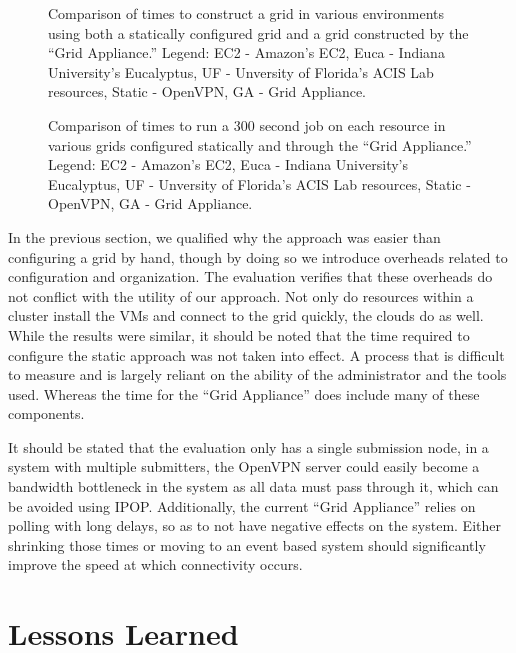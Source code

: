 \documentclass[conference]{IEEEtran}
\begin{document}
\begin{figure}[ht]
\centering
{}
\caption{Comparison of times to construct a grid in various environments using
both a statically configured grid and a grid constructed by the ``Grid
Appliance.''  Legend:  EC2 - Amazon's EC2, Euca - Indiana University's
Eucalyptus, UF - Unversity of Florida's ACIS Lab resources, Static - OpenVPN,
GA - Grid Appliance.}
\label{fig:connect}
\end{figure}

\begin{figure}[ht]
\centering
{}
\caption{Comparison of times to run a 300 second job on each resource in
various grids configured statically and through the ``Grid Appliance.''
Legend:  EC2 - Amazon's EC2, Euca - Indiana University's Eucalyptus, UF -
Unversity of Florida's ACIS Lab resources, Static - OpenVPN, GA - Grid
Appliance.}
\label{fig:run}
\end{figure}

In the previous section, we qualified why the approach was easier than
configuring a grid by hand, though by doing so we introduce overheads related
to configuration and organization.  The evaluation verifies that these
overheads do not conflict with the utility of our approach.  Not only do
resources within a cluster install the VMs and connect to the grid quickly, the
clouds do as well.  While the results were similar, it should be noted that the
time required to configure the static approach was not taken into effect.  A
process that is difficult to measure and is largely reliant on the ability of
the administrator and the tools used.  Whereas the time for the ``Grid
Appliance'' does include many of these components.

It should be stated that the evaluation only has a single submission node, in a
system with multiple submitters, the OpenVPN server could easily become a
bandwidth bottleneck in the system as all data must pass through it, which can
be avoided using IPOP.  Additionally, the current ``Grid Appliance'' relies on
polling with long delays, so as to not have negative effects on the system.
Either shrinking those times or moving to an event based system should
significantly improve the speed at which connectivity occurs.  

\section{Lessons Learned}
\label{lessons_learned}
\end{document}
